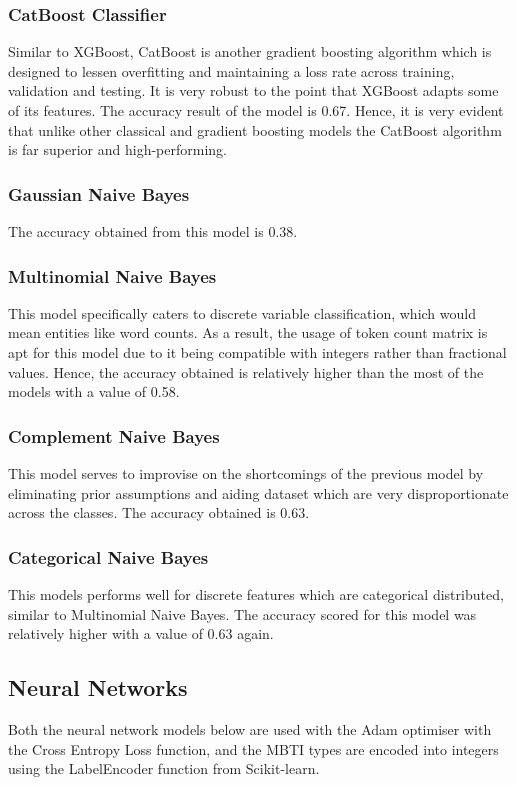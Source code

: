 \documentclass[11pt,a4paper]{article}
\begin{document}
	\subsubsection{CatBoost Classifier}
	Similar to XGBoost, CatBoost is another gradient boosting algorithm which is designed to lessen overfitting and maintaining a loss rate across training, validation and testing. It is very robust to the point that XGBoost adapts some of its features. The accuracy result of the model is 0.67. Hence, it is very evident that unlike other classical and gradient boosting models the CatBoost algorithm is far superior and high-performing.
	\subsubsection{Gaussian Naive Bayes}
	The accuracy obtained from this model is 0.38.
	\subsubsection{Multinomial Naive Bayes}
	This model specifically caters to discrete variable classification, which would mean entities like word counts. As a result, the usage of token count matrix is apt for this model due to it being compatible with integers rather than fractional values. Hence, the accuracy obtained is relatively higher than the most of the models with a value of 0.58.
	\subsubsection{Complement Naive Bayes}
	This model serves to improvise on the shortcomings of the previous model by eliminating prior assumptions and aiding dataset which are very disproportionate across the classes. The accuracy obtained is 0.63.
	\subsubsection{Categorical Naive Bayes}
	This models performs well for discrete features which are categorical distributed, similar to Multinomial Naive Bayes. The accuracy scored for this model was relatively higher with a value of 0.63 again.
	
	
	\subsection{Neural Networks}
	
	Both the neural network models below are used with the Adam optimiser with the Cross Entropy Loss function, and the MBTI types are encoded into integers using the LabelEncoder function from Scikit-learn.
	
\end{document}
